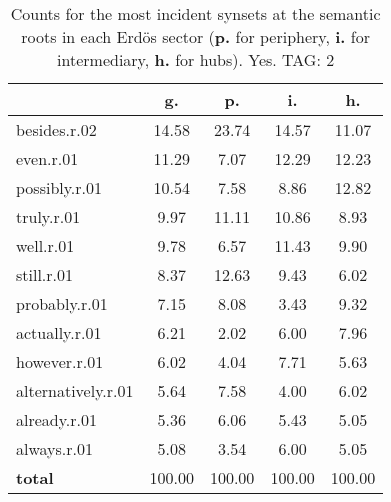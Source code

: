 \begin{table}[h!]
\begin{center}
\begin{tabular}{| l | c | c | c | c |}\hline
 & g. & p. & i. & h. \\\hline
besides.r.02 & 14.58  & 23.74  & 14.57  & 11.07 \\\hline
even.r.01 & 11.29  & 7.07  & 12.29  & 12.23 \\\hline
possibly.r.01 & 10.54  & 7.58  & 8.86  & 12.82 \\\hline
truly.r.01 & 9.97  & 11.11  & 10.86  & 8.93 \\\hline
well.r.01 & 9.78  & 6.57  & 11.43  & 9.90 \\\hline
still.r.01 & 8.37  & 12.63  & 9.43  & 6.02 \\\hline
probably.r.01 & 7.15  & 8.08  & 3.43  & 9.32 \\\hline
actually.r.01 & 6.21  & 2.02  & 6.00  & 7.96 \\\hline
however.r.01 & 6.02  & 4.04  & 7.71  & 5.63 \\\hline
alternatively.r.01 & 5.64  & 7.58  & 4.00  & 6.02 \\\hline
already.r.01 & 5.36  & 6.06  & 5.43  & 5.05 \\\hline
always.r.01 & 5.08  & 3.54  & 6.00  & 5.05 \\\hline
{{\bf total}} & 100.00  & 100.00  & 100.00  & 100.00 \\\hline
\end{tabular}
\caption{Counts for the most incident synsets at the semantic roots in each Erd\"os sector ({\bf p.} for periphery, {\bf i.} for intermediary, {\bf h.} for hubs). Yes. TAG: 2}
\end{center}
\end{table}